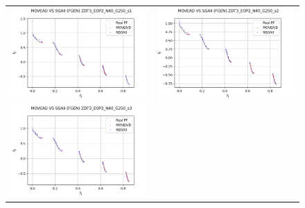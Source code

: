 \begin{figure}[H]
    \centering
    \begin{tabular}{c c}
    \includegraphics[scale=0.5]{figures/ZDT3_EOP2_N40_G250_T6/s1_comp.png} &
    \includegraphics[scale=0.5]{figures/ZDT3_EOP2_N40_G250_T6/s2_comp.png}\\
    \includegraphics[scale=0.5]{figures/ZDT3_EOP2_N40_G250_T6/s3_comp.png} &

\end{tabular}
\end{figure}

